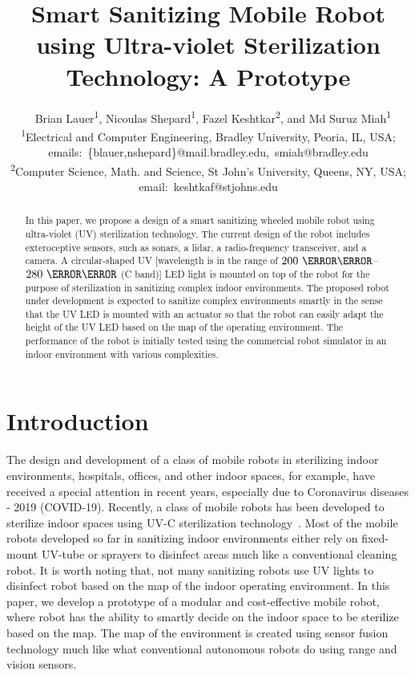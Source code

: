 \documentclass[letterpaper]{article} %
\title{Smart Sanitizing Mobile Robot using Ultra-violet Sterilization
  Technology: A Prototype}
\author{~%
Brian Lauer\textsuperscript{\rm 1}, Nicoulas Shepard\textsuperscript{\rm 1},
Fazel Keshtkar\textsuperscript{\rm 2}, and Md Suruz Miah\textsuperscript{\rm 1}
\\  
\textsuperscript{\rm 1}Electrical and Computer Engineering, Bradley University, Peoria, IL, USA; emails:~\{blauer,nshepard\}@mail.bradley.edu,~smiah@bradley.edu\\
\textsuperscript{\rm 2}Computer Science, Math. and Science, St John's University, Queens, NY, USA; email:~keshtkaf@stjohns.edu
}
\begin{document}
\maketitle

\begin{abstract}

  In this paper, we propose a design of a smart sanitizing wheeled mobile robot
  using ultra-violet (UV) sterilization technology. The current design of the
  robot includes exteroceptive sensors, such as sonars, a lidar, a radio-frequency
  transceiver, and a camera. A circular-shaped UV [wavelength is in the range of
  $200~\nano\meter$--$280~\nano\meter$ (C band)] LED light is mounted on top
  of the robot for the purpose of sterilization in sanitizing complex indoor
  environments. The proposed robot under development is expected to sanitize  
  complex environments smartly in the sense that the UV LED is mounted with an actuator so that the robot can
  easily adapt the height of the UV LED based on the map of the operating
  environment. The performance of the robot is
  initially tested using the commercial robot simulator in an indoor environment
  with various complexities.   

\end{abstract}

\section{Introduction}
\label{sec:introduction}

The design and development of a class of mobile robots in sterilizing indoor
environments, hospitals, offices, and other indoor spaces, for example, have
received a special attention in recent years, especially due to Coronavirus
diseases - 2019 (COVID-19). Recently, a class of mobile robots has been
developed to sterilize indoor spaces using UV-C sterilization
technology~. Most of the mobile robots developed so far in
sanitizing indoor environments either rely on fixed-mount UV-tube or sprayers to
disinfect areas much like a conventional cleaning robot. It is worth noting
that, not many sanitizing robots use UV lights to disinfect robot based on the
map of the indoor operating environment. In this paper, we develop a prototype
of a modular and cost-effective mobile robot, where robot has the ability to
smartly decide on the indoor space to  be sterilize based on the map. The map of
the environment is created using sensor fusion technology much like what
conventional autonomous robots do using range and vision sensors.
\end{document}
